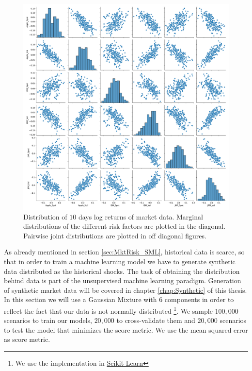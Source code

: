 \begin{figure}[H] 
\centering
\includegraphics[width=1.0\textwidth]{Figures/MarketRisk/histdata.pdf}
\caption{Distribution of $10$ days log returns of market data. Marginal distributions of the different risk factors are plotted in the diagonal. Pairwise joint distributions are plotted in off diagonal figures.}
\label{fig:distrib_P}
\end{figure}

As already mentioned in section \ref{sec:MktRisk_SML}, historical data is scarce, so that in order to train a machine learning model we have to generate synthetic data distributed as the historical shocks. The task of obtaining the distribution behind data is part of the unsupervised machine learning paradigm. Generation of synthetic market data will be covered in chapter \ref{chap:Synthetic} of this thesis. In this section we will use a Gaussian Mixture with $6$ components in order to reflect the fact that our data is not normally distributed \footnote{We use the implementation in \href{https://scikit-learn.org/stable/modules/generated/sklearn.mixture.GaussianMixture.html}{Scikit Learn}}. We sample $100,000$ scenarios to train our models, $20,000$ to cross-validate them and $20,000$ scenarios to test the model that minimizes the score metric. We use the mean squared error as score metric.

